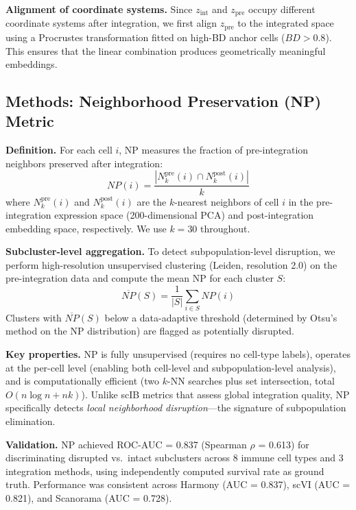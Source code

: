 \textbf{Alignment of coordinate systems.}
Since $z_{\text{int}}$ and $z_{\text{pre}}$ occupy different coordinate systems after integration, we first align $z_{\text{pre}}$ to the integrated space using a Procrustes transformation fitted on high-BD anchor cells ($BD > 0.8$). This ensures that the linear combination produces geometrically meaningful embeddings.

\subsection*{Methods: Neighborhood Preservation (NP) Metric}

\textbf{Definition.}
For each cell $i$, NP measures the fraction of pre-integration neighbors preserved after integration:
\begin{equation}
NP(i) = \frac{|N_k^{\text{pre}}(i) \cap N_k^{\text{post}}(i)|}{k}
\end{equation}
where $N_k^{\text{pre}}(i)$ and $N_k^{\text{post}}(i)$ are the $k$-nearest neighbors of cell $i$ in the pre-integration expression space (200-dimensional PCA) and post-integration embedding space, respectively. We use $k = 30$ throughout.

\textbf{Subcluster-level aggregation.}
To detect subpopulation-level disruption, we perform high-resolution unsupervised clustering (Leiden, resolution 2.0) on the pre-integration data and compute the mean NP for each cluster $S$:
\begin{equation}
\overline{NP}(S) = \frac{1}{|S|} \sum_{i \in S} NP(i)
\end{equation}
Clusters with $\overline{NP}(S)$ below a data-adaptive threshold (determined by Otsu's method on the NP distribution) are flagged as potentially disrupted.

\textbf{Key properties.}
NP is fully unsupervised (requires no cell-type labels), operates at the per-cell level (enabling both cell-level and subpopulation-level analysis), and is computationally efficient (two $k$-NN searches plus set intersection, total $O(n \log n + nk)$). Unlike scIB metrics that assess global integration quality, NP specifically detects \textit{local neighborhood disruption}---the signature of subpopulation elimination.

\textbf{Validation.}
NP achieved ROC-AUC = 0.837 (Spearman $\rho$ = 0.613) for discriminating disrupted vs.\ intact subclusters across 8 immune cell types and 3 integration methods, using independently computed survival rate as ground truth. Performance was consistent across Harmony (AUC = 0.837), scVI (AUC = 0.821), and Scanorama (AUC = 0.728).

